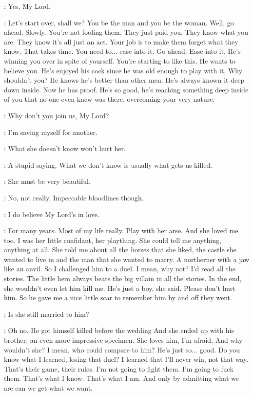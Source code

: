 \ROS: Yes, My Lord. 

\LITTLEFINGER: Let's start over, shall we? You be the man and you be the woman. Well, go ahead. Slowly. You're not fooling them. They just paid you. They know what you are. They know it's all just an act. Your job is to make them forget what they know. That takes time. You need to$\ldots$ ease into it. Go ahead. Ease into it. He's winning you over in spite of yourself. You're starting to like this. He wants to believe you. He's enjoyed his cock since he was old enough to play with it. Why shouldn't you? He knows he's better than other men. He's always known it deep down inside. Now he has proof. He's so good, he's reaching something deep inside of you that no one even knew was there, overcoming your very nature. 

\ROS: Why don't you join us, My Lord? 

\LITTLEFINGER: I'm saving myself for another. 

\ROS: What she doesn't know won't hurt her. 

\LITTLEFINGER: A stupid saying. What we don't know is usually what gets us killed. 

\ROS: She must be very beautiful. 

\LITTLEFINGER: No, not really. Impeccable bloodlines though. 

\ROS: I do believe My Lord's in love. 

\LITTLEFINGER: For many years. Most of my life really. Play with her arse. And she loved me too. I was her little confidant, her plaything. She could tell me anything, anything at all. She told me about all the horses that she liked, the castle she wanted to live in and the man that she wanted to marry. A northerner with a jaw like an anvil. So I challenged him to a duel. I mean, why not? I'd read all the stories. The little hero always beats the big villain in all the stories. In the end, she wouldn't even let him kill me. He's just a boy, she said. Please don't hurt him. So he gave me a nice little scar to remember him by and off they went. 

\ROS: Is she still married to him? 

\LITTLEFINGER: Oh no. He got himself killed before the wedding And she ended up with his brother, an even more impressive specimen. She loves him, I'm afraid. And why wouldn't she? I mean, who could compare to him? He's just so$\ldots$ good. Do you know what I learned, losing that duel? I learned that I'll never win, not that way. That's their game, their rules. I'm not going to fight them. I'm going to fuck them. That's what I know. That's what I am. And only by admitting what we are can we get what we want. 

